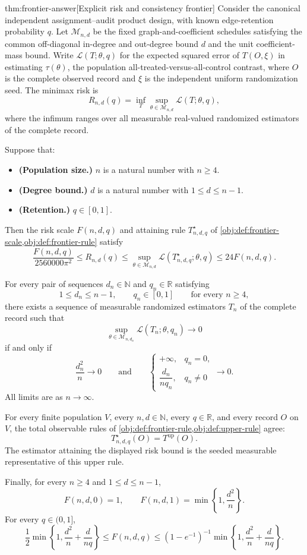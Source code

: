 \documentclass[11pt]{article}
\begin{document}
\begin{theoremv}{thm:frontier-answer}[Explicit risk and consistency frontier]
Consider the canonical independent assignment--audit product design, with known edge-retention probability \(q\). Let \(\mathcal M_{n,d}\) be the fixed graph-and-coefficient schedules satisfying the common off-diagonal in-degree and out-degree bound \(d\) and the unit coefficient-mass bound. Write \(\mathcal L(T;\theta,q)\) for the expected squared error of \(T(O,\xi)\) in estimating \(\tau(\theta)\), the population all-treated-versus-all-control contrast, where \(O\) is the complete observed record and \(\xi\) is the independent uniform randomization seed. The minimax risk is
\[
R_{n,d}(q)
=
\inf_T\sup_{\theta\in\mathcal M_{n,d}}\mathcal L(T;\theta,q),
\]
where the infimum ranges over all measurable real-valued randomized estimators of the complete record.

Suppose that:
\begin{itemize}
\item \textbf{(Population size.)} \(n\) is a natural number with \(n\ge4\).
\item \textbf{(Degree bound.)} \(d\) is a natural number with \(1\le d\le n-1\).
\item \textbf{(Retention.)} \(q\in[0,1]\).
\end{itemize}
Then the risk scale \(F(n,d,q)\) and attaining rule \(T^\star_{n,d,q}\) of \cref{obj:def:frontier-scale,obj:def:frontier-rule} satisfy
\[
\frac{F(n,d,q)}{2560000\pi^2}
\le R_{n,d}(q)
\le
\sup_{\theta\in\mathcal M_{n,d}}
\mathcal L(T^\star_{n,d,q};\theta,q)
\le 24F(n,d,q).
\]

For every pair of sequences \(d_n\in\mathbb N\) and \(q_n\in\mathbb R\) satisfying
\[
1\le d_n\le n-1,\qquad q_n\in[0,1]
\qquad\text{for every }n\ge4,
\]
there exists a sequence of measurable randomized estimators \(T_n\) of the complete record such that
\[
\sup_{\theta\in\mathcal M_{n,d_n}}
\mathcal L(T_n;\theta,q_n)\longrightarrow0
\]
if and only if
\[
\frac{d_n^2}{n}\longrightarrow0
\qquad\text{and}\qquad
\begin{cases}
+\infty,&q_n=0,\\[2pt]
\dfrac{d_n}{nq_n},&q_n\ne0
\end{cases}
\longrightarrow0.
\]
All limits are as \(n\to\infty\).

For every finite population \(V\), every \(n,d\in\mathbb N\), every \(q\in\mathbb R\), and every record \(O\) on \(V\), the total observable rules of \cref{obj:def:frontier-rule,obj:def:upper-rule} agree:
\[
T^\star_{n,d,q}(O)=T^{\mathrm{up}}(O).
\]
The estimator attaining the displayed risk bound is the seeded measurable representative of this upper rule.

Finally, for every \(n\ge4\) and \(1\le d\le n-1\),
\[
F(n,d,0)=1,
\qquad
F(n,d,1)=\min\left\{1,\frac{d^2}{n}\right\}.
\]
For every \(q\in(0,1]\),
\[
\frac12\min\left\{1,\frac{d^2}{n}+\frac{d}{nq}\right\}
\le F(n,d,q)
\le
(1-e^{-1})^{-1}
\min\left\{1,\frac{d^2}{n}+\frac{d}{nq}\right\}.
\]
\end{theoremv}
\end{document}
